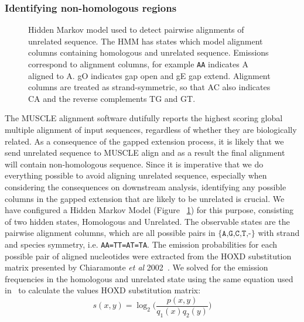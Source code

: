 \documentclass{ws-procs9x6}
\begin{document}
\subsubsection{Identifying non-homologous regions}
\begin{figure}[t]
\centering {}
\caption{Hidden Markov model used to detect pairwise alignments of unrelated sequence. The HMM has states which model alignment columns containing homologous and unrelated sequence.  Emissions correspond to alignment columns, for example \texttt{AA} indicates A aligned to A.  gO indicates gap open and gE gap extend. Alignment columns are treated as strand-symmetric, so that AC also indicates CA and the reverse complements TG and GT.}

\label{fig-hmm}\vspace{-0.2cm}
\end{figure}
The MUSCLE alignment software dutifully reports the highest scoring global multiple alignment of input sequences, regardless of whether they are biologically related. As a consequence of the gapped extension process, it is likely that we send unrelated sequence to MUSCLE align and as a result the final alignment will contain non-homologous sequence. Since it is imperative that we do everything possible to avoid aligning unrelated sequence, especially when considering the consequences on downstream analysis, identifying any possible columns in the gapped extension that are likely to be unrelated is crucial. We have configured a Hidden Markov Model (Figure ~\ref{fig-hmm}) for this purpose, consisting of two hidden states, Homologous and Unrelated. The observable states are the pairwise alignment columns, which are all possible pairs in $\texttt{{\{A,G,C,T,-\}}}$ with strand and species symmetry, i.e. \texttt{AA=TT=AT=TA}.  The emission probabilities for each possible pair of aligned nucleotides were extracted from the HOXD substitution matrix presented by Chiaramonte \textit{et al} 2002~\cite{hoxd}. We solved for the emission frequencies in the homologous and unrelated state using the same equation used in~\cite{hoxd} to calculate the values HOXD substitution matrix:
\begin{equation}
s(x,y)= \log_{2}{\Bigg(\frac{p(x,y)}{q_{1}(x)q_{2}(y)}\Bigg)}
\end{equation}
\end{document}
